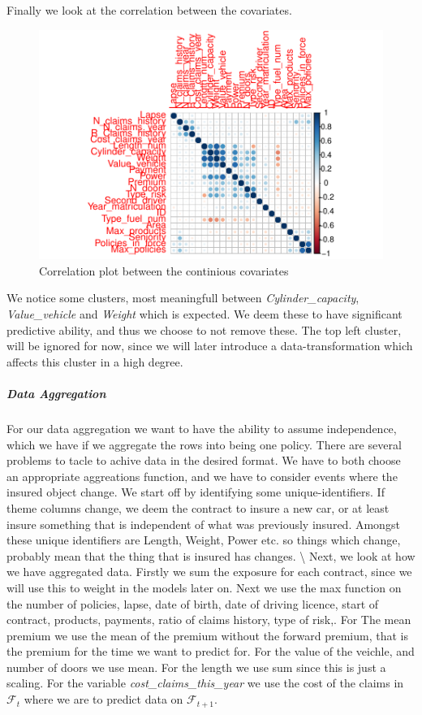 \documentclass[
]{article}
\begin{document}
Finally we look at the correlation between the covariates.

\begin{figure}

{\centering \includegraphics{assignment_uptodat_files/figure-latex/corplot-1} 

}

\caption{Correlation plot between the continious covariates}\label{fig:corplot}
\end{figure}

We notice some clusters, most meaningfull between
\emph{Cylinder\_capacity}, \emph{Value\_vehicle} and \emph{Weight} which
is expected. We deem these to have significant predictive ability, and
thus we choose to not remove these. The top left cluster, will be
ignored for now, since we will later introduce a data-transformation
which affects this cluster in a high degree.

\subparagraph{Data Aggregation}\label{data-aggregation}

For our data aggregation we want to have the ability to assume
independence, which we have if we aggregate the rows into being one
policy. There are several problems to tacle to achive data in the
desired format. We have to both choose an appropriate aggreations
function, and we have to consider events where the insured object
change. We start off by identifying some unique-identifiers. If theme
columns change, we deem the contract to insure a new car, or at least
insure something that is independent of what was previously insured.
Amongst these unique identifiers are Length, Weight, Power etc. so
things which change, probably mean that the thing that is insured has
changes. \textbackslash{} Next, we look at how we have aggregated data.
Firstly we sum the exposure for each contract, since we will use this to
weight in the models later on. Next we use the max function on the
number of policies, lapse, date of birth, date of driving licence, start
of contract, products, payments, ratio of claims history, type of risk,.
For The mean premium we use the mean of the premium without the forward
premium, that is the premium for the time we want to predict for. For
the value of the veichle, and number of doors we use mean. For the
length we use sum since this is just a scaling. For the variable
\emph{cost\_claims\_this\_year} we use the cost of the claims in
\(\mathcal{F}_t\) where we are to predict data on \(\mathcal{F}_{t+1}\).
\end{document}
